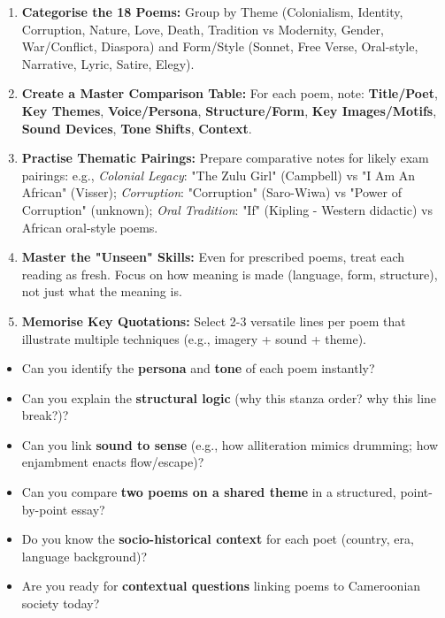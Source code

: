 \documentclass[11pt]{article}
\newcommand{\cle}[1]{{\popxbold\color{popdark}#1}}
\begin{document}
\begin{methode}
\begin{enumerate}
    \item \textbf{Categorise the 18 Poems:} Group by \cle{Theme} (Colonialism, Identity, Corruption, Nature, Love, Death, Tradition vs Modernity, Gender, War/Conflict, Diaspora) and \cle{Form/Style} (Sonnet, Free Verse, Oral-style, Narrative, Lyric, Satire, Elegy).
    \item \textbf{Create a Master Comparison Table:} For each poem, note: \textbf{Title/Poet}, \textbf{Key Themes}, \textbf{Voice/Persona}, \textbf{Structure/Form}, \textbf{Key Images/Motifs}, \textbf{Sound Devices}, \textbf{Tone Shifts}, \textbf{Context}.
    \item \textbf{Practise Thematic Pairings:} Prepare comparative notes for likely exam pairings: e.g., \emph{Colonial Legacy}: "The Zulu Girl" (Campbell) vs "I Am An African" (Visser); \emph{Corruption}: "Corruption" (Saro-Wiwa) vs "Power of Corruption" (unknown); \emph{Oral Tradition}: "If" (Kipling - Western didactic) vs African oral-style poems.
    \item \textbf{Master the "Unseen" Skills:} Even for prescribed poems, treat each reading as fresh. Focus on \cle{how} meaning is made (language, form, structure), not just \cle{what} the meaning is.
    \item \textbf{Memorise Key Quotations:} Select 2-3 versatile lines per poem that illustrate multiple techniques (e.g., imagery + sound + theme).
\end{enumerate}
\end{methode}

\begin{aretenir}
\begin{itemize}
    \item Can you identify the \textbf{persona} and \textbf{tone} of each poem instantly?
    \item Can you explain the \textbf{structural logic} (why this stanza order? why this line break?)?
    \item Can you link \textbf{sound to sense} (e.g., how alliteration mimics drumming; how enjambment enacts flow/escape)?
    \item Can you compare \textbf{two poems on a shared theme} in a structured, point-by-point essay?
    \item Do you know the \textbf{socio-historical context} for each poet (country, era, language background)?
    \item Are you ready for \textbf{contextual questions} linking poems to Cameroonian society today?
\end{itemize}
\end{aretenir}
\end{document}
